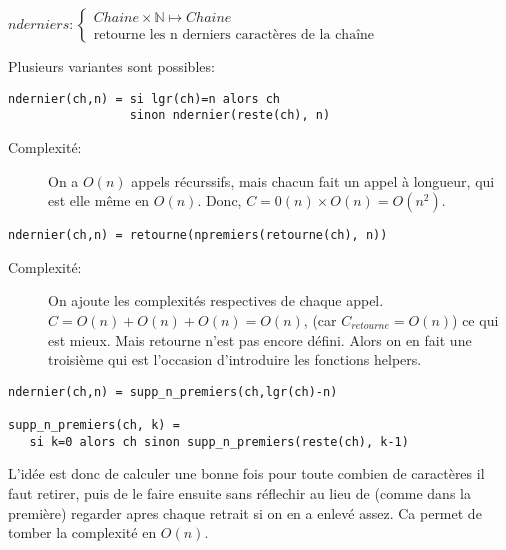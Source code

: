 \documentclass[10pt]{article}\usepackage[correction,nu]{esial}
\begin{document}
\begin{Question}
  $nderniers: \left\{
    \begin{array}{l}
      Chaine\times\mathbb{N}\mapsto Chaine\\
      \text{retourne les n derniers caractères de la chaîne}
    \end{array}\right.$  
\end{Question}
\begin{Reponse}
  Plusieurs variantes sont possibles:
  \begin{Verbatim}[label=nderniers (ch\quotesinglbase n) -- version naive]
ndernier(ch,n) = si lgr(ch)=n alors ch
                 sinon ndernier(reste(ch), n)    
  \end{Verbatim}
  \begin{description}
  \item[Complexité:] On a $O(n)$ appels récurssifs, mais chacun fait un appel à
    longueur, qui est elle même en $O(n)$. Donc, $C=0(n)\times
    O(n)=O(n^2)$. 
  \end{description}

  \begin{Verbatim}[label=nderniers (ch\quotesinglbase n) -- avec retourne]
ndernier(ch,n) = retourne(npremiers(retourne(ch), n))
  \end{Verbatim}
  \begin{description}
  \item[Complexité:] On ajoute les complexités respectives de chaque appel. $C
    = O(n) + O(n) + O(n) = O(n)$, (car $C_{retourne}=O(n)$) ce qui est
    mieux. Mais retourne n'est pas encore défini. Alors on en fait une
    troisième qui est l'occasion d'introduire les fonctions helpers.
  \end{description}

  \begin{Verbatim}[label=nderniers (ch\quotesinglbase n) -- avec fonction d'aide]
ndernier(ch,n) = supp_n_premiers(ch,lgr(ch)-n)

supp_n_premiers(ch, k) =
   si k=0 alors ch sinon supp_n_premiers(reste(ch), k-1)
  \end{Verbatim}

  L'idée est donc de calculer une bonne fois pour toute combien de caractères
  il faut retirer, puis de le faire ensuite sans réflechir au lieu de (comme
  dans la première) regarder apres chaque retrait si on en a enlevé assez. Ca
  permet de tomber la complexité en $O(n)$.
\end{Reponse}
\end{document}
